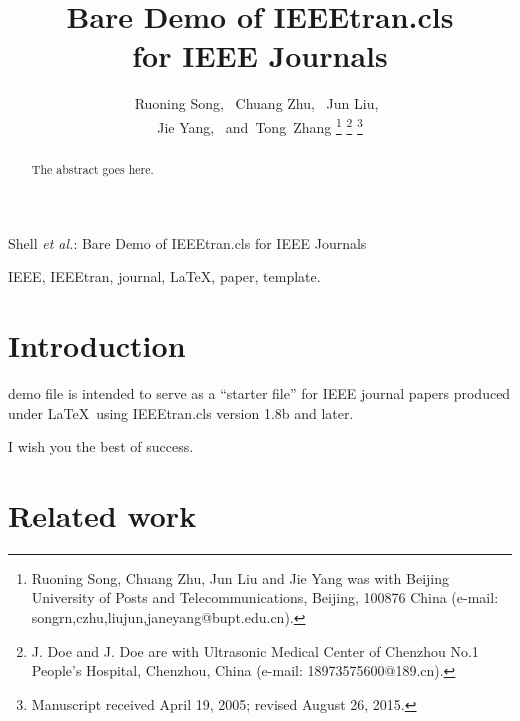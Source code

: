 \documentclass[journal]{IEEEtran}
\begin{document}
\title{Bare Demo of IEEEtran.cls\\ for IEEE Journals}

\author{Ruoning Song,~
        Chuang Zhu,~
        Jun Liu,~\\        
        Jie Yang,~        
        and~Tong~Zhang%
\thanks{Ruoning Song, Chuang Zhu, Jun Liu and Jie Yang was with Beijing University of Posts and Telecommunications, Beijing, 100876 China (e-mail: songrn,czhu,liujun,janeyang@bupt.edu.cn).}%
\thanks{J. Doe and J. Doe are with Ultrasonic Medical Center of Chenzhou No.1 People's Hospital, Chenzhou, China (e-mail: 18973575600@189.cn).}%
\thanks{Manuscript received April 19, 2005; revised August 26, 2015.}}


%
{Shell \MakeLowercase{\textit{et al.}}: Bare Demo of IEEEtran.cls for IEEE Journals}

\maketitle

\begin{abstract}
The abstract goes here.
\end{abstract}

\begin{IEEEkeywords}
IEEE, IEEEtran, journal, \LaTeX, paper, template.
\end{IEEEkeywords}


\section{Introduction}
 demo file is intended to serve as a ``starter file''
for IEEE journal papers produced under \LaTeX\ using
IEEEtran.cls version 1.8b and later.
 
I wish you the best of success.

\section{Related work}\label{section_related_work}
\end{document}
